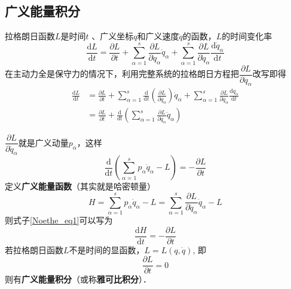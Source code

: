 \subsection{广义能量积分}

拉格朗日函数$L $是时间$t$ 、广义坐标$q $和广义速度$\dot q$的函数，$ L $的时间变化率
\begin{equation}
\frac{\mathrm{d} L}{\mathrm{d} t}=\frac{\partial L}{\partial t}+\sum_{\alpha=1}^{s} \frac{\partial L}{\partial q_{\alpha}} \dot{q}_{\alpha}+\sum_{\alpha=1}^{s} \frac{\partial L}{\partial \dot{q}_{\alpha}} \frac{\mathrm{d} \dot{q}_{\alpha}}{\mathrm{d} t}
\end{equation}
在主动力全是保守力的情况下，利用完整系统的拉格朗日方程把$\dfrac{\partial L}{\partial q_{\alpha}}$改写即得
\begin{equation}
\begin{aligned} \frac{\mathrm{d} L}{\mathrm{d} t} &=\frac{\partial L}{\partial t}+\sum_{\alpha=1}^{s} \frac{\mathrm{d}}{\mathrm{d} t}\left(\frac{\partial L}{\partial \dot{q}_{\alpha}}\right) \dot{q}_{\alpha}+\sum_{\alpha=1}^{s} \frac{\partial L}{\partial \dot{q}_{\alpha}} \frac{\mathrm{d} \dot{q}_{\alpha}}{\mathrm{d} t} \\ &=\frac{\partial L}{\partial t}+\frac{\mathrm{d}}{d t}\left(\sum_{\alpha=1}^{s} \frac{\partial L}{\partial \dot{q}_{\alpha}} \dot{q}_{\alpha}\right) \end{aligned}
\end{equation}

$\dfrac{\partial L}{\partial \dot{q}_{\alpha}}$就是广义动量$p_\alpha$，这样
\begin{equation} \label{Noethe_eq1}
\frac{\mathrm{d}}{\mathrm{d} t}\left(\sum_{\alpha=1}^{s} p_{\alpha} \dot{q}_{\alpha}-L\right)=-\frac{\partial L}{\partial t}
\end{equation}
定义\textbf{广义能量函数}（其实就是哈密顿量）
\begin{equation} \label{Noethe_eq2}
H=\sum_{\alpha=1}^{s} p_{\alpha} \dot{q}_{\alpha}-L=\sum_{\alpha=1}^{s} \frac{\partial L}{\partial \dot{q}_{\alpha}} \dot{q}_{\alpha}-L
\end{equation}
则式子\autoref{Noethe_eq1}可以写为
\begin{equation}
\frac{\mathrm{d} H}{\mathrm{d} t}=-\frac{\partial L}{\partial t}
\end{equation}
若拉格朗日函数$L$不是时间的显函数，$ L = L(q, \dot q)$, 即
\begin{equation}
\frac{\partial L}{\partial t}=0
\end{equation}
则有\textbf{广义能量积分}（或称\textbf{雅可比积分}）．

